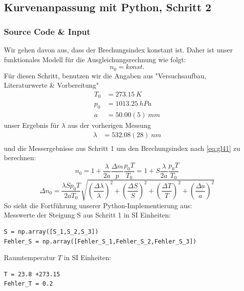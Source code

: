 \documentclass[a4paper,10pt]{article}
\begin{document}
\subsection{Kurvenanpassung mit Python, Schritt 2}
\subsubsection{Source Code \& Input}
Wir gehen davon aus, dass der Brechungsindex konstant ist.
Daher ist unser funktionales Modell für die Ausgleichungsrechnung wie folgt:
\begin{equation} \label{eq:Fit3}
	\boxed{n_0 = konst.}
\end{equation} 
Für diesen Schritt, benutzen wir die Angaben aus "Versuchsaufbau, Literaturwerte \& Vorbereitung" 
\begin{align*}
T_0&=273.15\:K\\
p_0&=1013.25\:hPa\\
a&=50.00(5)\:mm
\end{align*}
unser Ergebnis für \(\lambda\) aus der vorherigen Messung
\begin{align*}
\lambda&=532.08(28)\:nm\\
\end{align*}
und die Messergebnisse aus Schritt 1 um den Brechungsindex nach \eqref{eq:gl41} zu berechnen:
\begin{equation} \label{eq:n_0}
	n_0= 1+\frac{\lambda}{2a}\frac{\Delta m}{p}\frac{p_0 T}{T_0} = 1+ S \frac{\lambda}{2a}\frac{p_0 T}{T_0}
\end{equation} 
\begin{equation} \label{eq:Deltan_0}
	\Delta n_0= \frac{\lambda S p_0 T}{2 a T_0} \sqrt{{\left(\frac{\Delta \lambda}{\lambda}\right)}^2+{\left(\frac{\Delta S}{S}\right)}^2+{\left(\frac{\Delta T}{T}\right)}^2+{\left(\frac{\Delta a}{a}\right)}^2}
\end{equation} 
So sieht die Fortführung unserer Python-Implementierung aus:\\

Messwerte der Steigung S aus Schritt 1 in SI Einheiten:
\begin{lstlisting}
S = np.array([S_1,S_2,S_3])
Fehler_S = np.array([Fehler_S_1,Fehler_S_2,Fehler_S_3])

\end{lstlisting}

Raumtemperatur \( T\) in SI Einheiten:
\begin{lstlisting}
T = 23.8 +273.15
Fehler_T = 0.2

\end{lstlisting}
\end{document}
